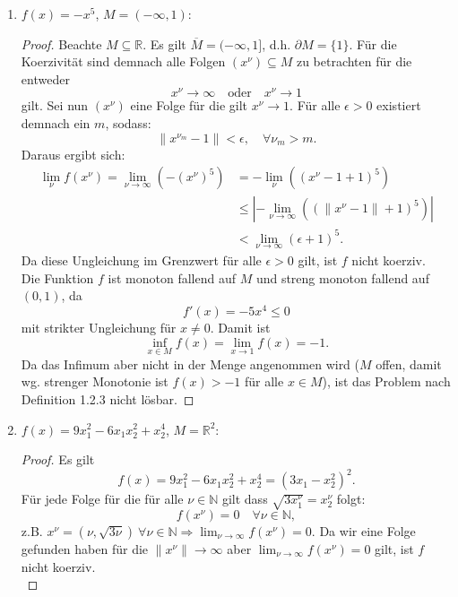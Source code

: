 \documentclass[12pt]{extreport} %
\newcommand{\N}{\mathbb{N}}
\newcommand{\R}{\mathbb{R}}
\theoremstyle{named}
\theoremstyle{nnamed}
\theoremstyle{itshape}
\theoremstyle{normal}
\begin{document}
	\begin{enumerate}
		\item $f(x) = - x^5$, $M =(- \infty, 1)$: ~\medskip
			\begin{proof}
			Beachte $M \subseteq \R$. Es gilt $\overline{M} = (-\infty, 1]$, d.h. $\partial M = \{ 1 \}$. Für die Koerzivität sind demnach alle Folgen $\left( x^\nu \right) \subseteq M$ zu betrachten für die entweder
			$$ x^\nu \longrightarrow \infty \quad \text{oder} \quad x^\nu \longrightarrow 1 $$
			gilt. Sei nun $(x^\nu)$ eine Folge für die gilt $x^\nu \rightarrow 1$. Für alle $\epsilon > 0$ existiert demnach ein $m$, sodass:
			$$ \| x^{\nu_m} - 1 \| < \epsilon, \quad \forall \nu_m > m. $$
			Daraus ergibt sich:
			\begin{align*}
				 \lim_\nu f(x^\nu) = \lim_{\nu \rightarrow \infty} \left( - \left(x^\nu \right)^5 \right) & = -  \lim_\nu \left( \left(x^\nu - 1 + 1 \right)^5 \right) \\
				 	& \leq \left| - \lim_{\nu \rightarrow \infty}  \left( \left( \| x^\nu -1 \| + 1 \right)^5 \right) \right| \\
				 	& < \lim_{\nu \rightarrow \infty}  \left( \epsilon + 1 \right)^5.  
			\end{align*}
			Da diese Ungleichung im Grenzwert für alle $\epsilon > 0$ gilt, ist $f$ nicht koerziv. ~\\ 
			
			Die Funktion $f$ ist monoton fallend auf $M$ und streng monoton fallend auf $(0, 1)$, da
			$$ f'(x) = - 5 x^4 \leq 0 $$
			mit strikter Ungleichung für $x \neq 0$. Damit ist 
			$$ \inf_{x \in M} f(x) = \lim_{x \rightarrow 1} f(x) = -1. $$
			Da das Infimum aber nicht in der Menge angenommen wird ($M$ offen, damit wg. strenger Monotonie ist $f(x) > -1$ für alle $x \in M$), ist das Problem nach Definition 1.2.3 nicht lösbar. 
			\end{proof}
		\item  $f(x) = 9 x_1^2 - 6 x_1 x_2^2 + x_2^4$, $M = \R^2$:
			\begin{proof}
			Es gilt
			$$ f(x) = 9 x_1^2 - 6 x_1 x_2^2 + x_2^4 = (3 x_1 - x_2^2)^2. $$
			Für jede Folge für die für alle $\nu \in \N$ gilt dass $\sqrt{3 x^\nu_1} = x^\nu_2$ folgt:
			$$ f(x^\nu) = 0 \quad \forall \nu \in \N, $$
			z.B. $x^\nu = (\nu, \sqrt{3\nu}) ~\forall \nu \in \N \Rightarrow \lim_{\nu \rightarrow \infty} f(x^\nu) = 0$. Da wir eine Folge gefunden haben für die $\| x^\nu \| \rightarrow \infty$ aber $\lim_{\nu \rightarrow \infty} f(x^\nu) = 0$ gilt, ist $f$ nicht koerziv. ~\\ 
			

\end{proof}
\end{enumerate}
\end{document}
